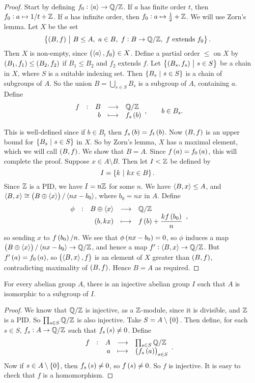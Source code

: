 \begin{proof}
Start by defining $ f_0 : \left\langle a \right\rangle \to \mathbb{Q} / \mathbb{Z} $. If $ a $ has finite order $ t $, then $ f_0 : a \mapsto 1 / t + \mathbb{Z} $. If $ a $ has infinite order, then $ f_0 : a \mapsto \tfrac{1}{2} + \mathbb{Z} $. We will use Zorn's lemma. Let $ X $ be the set
$$ \cbr{\br{B, f} \st B \le A, \ a \in B, \ f : B \to \QQ / \ZZ, \ f \ \text{extends} \ f_0}. $$
Then $ X $ is non-empty, since $ \br{\abr{a}, f_0} \in X $. Define a partial order $ \le $ on $ X $ by $ \br{B_1, f_1} \le \br{B_2, f_2} $ if $ B_1 \le B_2 $ and $ f_2 $ extends $ f $. Let $ \cbr{\br{B_s, f_s} \st s \in S} $ be a chain in $ X $, where $ S $ is a suitable indexing set. Then $ \cbr{B_s \st s \in S} $ is a chain of subgroups of $ A $. So the union $ B = \bigcup_{s \in S} B_s $ is a subgroup of $ A $, containing $ a $. Define
$$ \function[f]{B}{\QQ / \ZZ}{b}{f_s\br{b}}, \qquad b \in B_s. $$

\pagebreak

This is well-defined since if $ b \in B_t $ then $ f_s\br{b} = f_t\br{b} $. Now $ \br{B, f} $ is an upper bound for $ \cbr{B_s \st s \in S} $ in $ X $. So by Zorn's lemma, $ X $ has a maximal element, which we will call $ \br{B, f} $. We show that $ B = A $. Since $ f\br{a} = f_0\br{a} $, this will complete the proof. Suppose $ x \in A \setminus B $. Then let $ I < \mathbb{Z} $ be defined by
$$ I = \cbr{k \st kx \in B}. $$
Since $ \mathbb{Z} $ is a PID, we have $ I = n\mathbb{Z} $ for some $ n $. We have $ \left\langle B, x \right\rangle \le A $, and $ \abr{B, x} \cong \br{B \oplus \abr{x}} / \abr{nx - b_0} $, where $ b_0 = nx $ in $ A $. Define
$$ \function[\phi]{B \oplus \abr{x}}{\QQ / \ZZ}{\br{b, kx}}{f\br{b} + \dfrac{kf\br{b_0}}{n}}, $$
so sending $ x $ to $ f\br{b_0} / n $. We see that $ \phi\br{nx - b_0} = 0 $, so $ \phi $ induces a map $ \br{B \oplus \abr{x}} / \abr{nx - b_0} \to \QQ / \ZZ $, and hence a map $ f' : \left\langle B, x \right\rangle \to \mathbb{Q} / \mathbb{Z} $. But $ f'\br{a} = f_0\br{a} $, so $ \br{\abr{B, x}, f} $ is an element of $ X $ greater than $ \br{B, f} $, contradicting maximality of $ \br{B, f} $. Hence $ B = A $ as required.
\end{proof}


\begin{proposition}
For every abelian group $ A $, there is an injective abelian group $ I $ such that $ A $ is isomorphic to a subgroup of $ I $.
\end{proposition}

\begin{proof}
We know that $ \mathbb{Q} / \mathbb{Z} $ is injective, as a $ \mathbb{Z} $-module, since it is divisible, and $ \mathbb{Z} $ is a PID. So $ \prod_{s \in S} \mathbb{Q} / \mathbb{Z} $ is also injective. Take $ S = A \setminus \cbr{0} $. Then define, for each $ s \in S $, $ f_s : A \to \mathbb{Q} / \mathbb{Z} $ such that $ f_s\br{s} \ne 0 $. Define
$$ \function[f]{A}{\prod_{s \in S} \QQ / \ZZ}{a}{\br{f_s\br{a}}_{s \in S}}. $$
Now if $ s \in A \setminus \cbr{0} $, then $ f_s\br{s} \ne 0 $, so $ f\br{s} \ne 0 $. So $ f $ is injective. It is easy to check that $ f $ is a homomorphism.
\end{proof}

